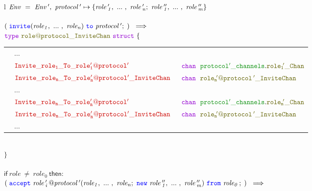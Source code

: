 \documentclass[12pt,twoside]{report}
\begin{document}
\begin{figure}[!h]
    \begin{center}
        \begin{tabular}{l}
            $\mathit{Env\ =\ Env\,',\ protocol\,' \mapsto \{\roles{role\,'}{n};\ \roles{role\,''}{m}\}}$\\\\

            $(\;\invite(\roles{role}{n})\ \scrto\ \mathit{protocol\,'};\;)\ \implies$\\[6pt]

            {\footnotesize
            $\gotype\ \structname{\localprotocol{role}{protocol}\_InviteChan}\ \gostruct\ \{$}\\[3pt]
            {\footnotesize
            \begin{tabular}{lll}
                
                \indent & $\dots$ & \\[9pt]
                \indent & $\structfield{Invite\_role_1\_To\_\localprotocol{role'_1}{protocol'}}$\ &$\gochan\ \;\pkgstructaccess{protocol'\_channels}{role_1\!'\_Chan}$\\
                \indent & $\structfield{Invite\_role_n\_To\_\localprotocol{role'_n}{protocol'}\_InviteChan}$\ &$\gochan\ \; \structname{\localprotocol{role_n\!'}{protocol\,'}\_InviteChan}$\\
                \indent & $\dots$ & \\
                \indent & $\structfield{Invite\_role_n\_To\_\localprotocol{role'_n}{protocol'}}$\ &$\gochan\ \;\pkgstructaccess{protocol'\_channels}{role_n\!'\_Chan}$\\
                \indent & $\structfield{Invite\_role_n\_To\_\localprotocol{role'_n}{protocol'}\_InviteChan}$\ &$\gochan\ \; \structname{\localprotocol{role_n\!'}{protocol\,'}\_InviteChan}$\\[7pt]
                \indent & $\dots$ & 
            \end{tabular}}\\
            {\footnotesize$\}$}\\\\[5pt]


            $\textsf{if}\ \mathit{role\ \neq\ role_0}\ \textsf{then}:$\\[6pt]
            $(\;\accept\ \mathit{\localprotocol{role\,'_i\,}{protocol}\,'}(\roles{role}{n};\ \scrnew\ \roles{role\,''}{m})\ \from\ \mathit{role_0}\,;\;)\ \implies$\\[6pt]
            

\end{tabular}
\end{center}
\end{figure}
\end{document}
